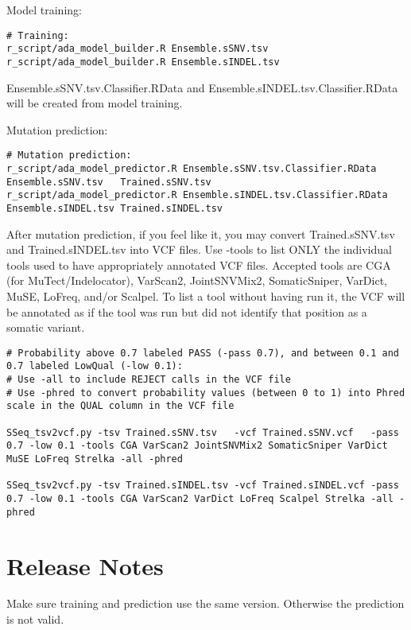 \documentclass[10pt,letterpaper]{article}
\begin{document}
\begin{sloppypar}
Model training:
\begin{lstlisting}
# Training:
r_script/ada_model_builder.R Ensemble.sSNV.tsv
r_script/ada_model_builder.R Ensemble.sINDEL.tsv
\end{lstlisting}
	
Ensemble.sSNV.tsv.Classifier.RData and Ensemble.sINDEL.tsv.Classifier.RData will be created from model training.
	

Mutation prediction:
	
\begin{lstlisting}
# Mutation prediction:
r_script/ada_model_predictor.R Ensemble.sSNV.tsv.Classifier.RData   Ensemble.sSNV.tsv   Trained.sSNV.tsv
r_script/ada_model_predictor.R Ensemble.sINDEL.tsv.Classifier.RData Ensemble.sINDEL.tsv Trained.sINDEL.tsv
\end{lstlisting}

	
After mutation prediction, if you feel like it, you may convert Trained.sSNV.tsv and Trained.sINDEL.tsv into VCF files. Use -tools to list ONLY the individual tools used to have appropriately annotated VCF files. Accepted tools are CGA (for MuTect/Indelocator), VarScan2, JointSNVMix2, SomaticSniper, VarDict, MuSE, LoFreq, and/or Scalpel. To list a tool without having run it, the VCF will be annotated as if the tool was run but did not identify that position as a somatic variant. 


\begin{lstlisting}
# Probability above 0.7 labeled PASS (-pass 0.7), and between 0.1 and 0.7 labeled LowQual (-low 0.1):
# Use -all to include REJECT calls in the VCF file
# Use -phred to convert probability values (between 0 to 1) into Phred scale in the QUAL column in the VCF file

SSeq_tsv2vcf.py -tsv Trained.sSNV.tsv   -vcf Trained.sSNV.vcf   -pass 0.7 -low 0.1 -tools CGA VarScan2 JointSNVMix2 SomaticSniper VarDict MuSE LoFreq Strelka -all -phred

SSeq_tsv2vcf.py -tsv Trained.sINDEL.tsv -vcf Trained.sINDEL.vcf -pass 0.7 -low 0.1 -tools CGA VarScan2 VarDict LoFreq Scalpel Strelka -all -phred
\end{lstlisting}







\section{Release Notes}

Make sure training and prediction use the same version. Otherwise the prediction is not valid. 



\end{sloppypar}
\end{document}
